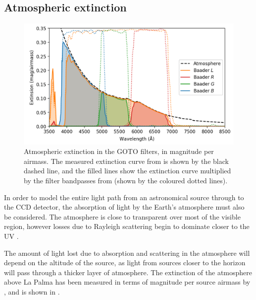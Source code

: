 
\subsection{Atmospheric extinction}
\label{sec:atmosphere}
\begin{colsection}

\begin{figure}[t]
    \begin{center}
        \includegraphics[width=\linewidth]{images/throughput/ext2.png}
    \end{center}
    \caption[Atmospheric extinction in the GOTO filters]{
        Atmospheric extinction in the GOTO filters, in magnitude per airmass. The measured extinction curve from \citet{tn31} is shown by the black dashed line, and the filled lines show the extinction curve multiplied by the filter bandpasses from  (shown by the coloured dotted lines).
    }\label{fig:extinction}
\end{figure}

In order to model the entire light path from an astronomical source through to the CCD detector, the absorption of light by the Earth's atmosphere must also be considered. The atmosphere is close to transparent over most of the visible region, however losses due to Rayleigh scattering begin to dominate closer to the UV \citep{atmosphere}.

The amount of light lost due to absorption and scattering in the atmosphere will depend on the altitude of the source, as light from sources closer to the horizon will pass through a thicker layer of atmosphere. The extinction of the atmosphere above La Palma has been measured in terms of magnitude per source airmass by \citet{tn31}, and is shown in .


\end{colsection}
